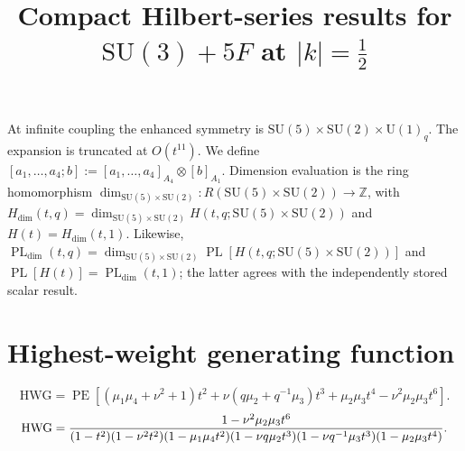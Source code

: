 \documentclass[10pt]{article}
\title{Compact Hilbert-series results for $\mathrm{SU(3)}+5F$ at $\lvert k\rvert=\frac{1}{2}$}
\date{}
\newcommand{\PE}{\operatorname{PE}}
\begin{document}
\maketitle
At infinite coupling the enhanced symmetry is $\mathrm{SU}(5)\times\mathrm{SU}(2)\times\mathrm{U}(1)_q$.
The expansion is truncated at $O(t^{11})$.  We define
$[a_1,\ldots,a_4;b]:=[a_1,\ldots,a_4]_{A_4}\otimes[b]_{A_1}$.
Dimension evaluation is the ring homomorphism
$\dim_{\mathrm{SU}(5)\times\mathrm{SU}(2)}:R(\mathrm{SU}(5)\times\mathrm{SU}(2))\to\mathbb{Z}$, with
$H_{\mathrm{dim}}(t,q)=\dim_{\mathrm{SU}(5)\times\mathrm{SU}(2)}H(t,q;\mathrm{SU}(5)\times\mathrm{SU}(2))$
and $H(t)=H_{\mathrm{dim}}(t,1)$.  Likewise,
$\operatorname{PL}_{\mathrm{dim}}(t,q)=\dim_{\mathrm{SU}(5)\times\mathrm{SU}(2)}
\operatorname{PL}[H(t,q;\mathrm{SU}(5)\times\mathrm{SU}(2))]$ and
$\operatorname{PL}[H(t)]=\operatorname{PL}_{\mathrm{dim}}(t,1)$;
the latter agrees with the independently stored scalar result.

\section{Highest-weight generating function}
\begin{equation}
\mathrm{HWG}=\PE\!\left[(\mu_1\mu_4+\nu^2+1)t^2
+\nu(q\mu_2+q^{-1}\mu_3)t^3
+\mu_2\mu_3t^4-\nu^2\mu_2\mu_3t^6\right].
\end{equation}
\begin{equation}
\resizebox{0.98\linewidth}{!}{${\displaystyle
\mathrm{HWG}=\frac{1-\nu^2\mu_2\mu_3t^6}
{(1-t^2)(1-\nu^2t^2)(1-\mu_1\mu_4t^2)
 (1-\nu q\mu_2t^3)(1-\nu q^{-1}\mu_3t^3)(1-\mu_2\mu_3t^4)}.}$}
\end{equation}
\end{document}

